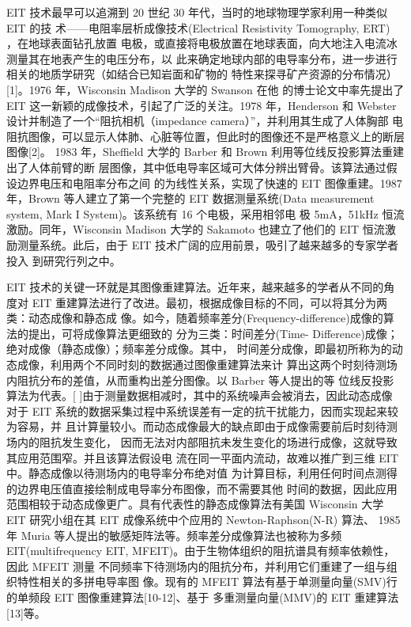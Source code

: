 
EIT 技术最早可以追溯到 20 世纪 30 年代，当时的地球物理学家利用一种类似 EIT 的技
术——电阻率层析成像技术(Electrical Resistivity Tomography, ERT) ，在地球表面钻孔放置
电极，或直接将电极放置在地球表面，向大地注入电流冰测量其在地表产生的电压分布，以
此来确定地球内部的电导率分布，进一步进行相关的地质学研究（如结合已知岩面和矿物的
特性来探寻矿产资源的分布情况）[1]。1976 年，Wisconsin Madison 大学的 Swanson 在他
的博士论文中率先提出了 EIT 这一新颖的成像技术，引起了广泛的关注。1978 年，Henderson
和 Webster 设计并制造了一个“阻抗相机（impedance camera）”，并利用其生成了人体胸部
电阻抗图像，可以显示人体肺、心脏等位置，但此时的图像还不是严格意义上的断层图像[2]。
1983 年，Sheffield 大学的 Barber 和 Brown 利用等位线反投影算法重建出了人体前臂的断
层图像，其中低电导率区域可大体分辨出臂骨。该算法通过假设边界电压和电阻率分布之间
的为线性关系，实现了快速的 EIT 图像重建。1987 年，Brown 等人建立了第一个完整的 EIT
数据测量系统(Data measurement system, Mark I System)。该系统有 16 个电极，采用相邻电
极 5mA，51kHz 恒流激励。同年，Wisconsin Madison 大学的 Sakamoto 也建立了他们的 EIT
恒流激励测量系统。此后，由于 EIT 技术广阔的应用前景，吸引了越来越多的专家学者投入
到研究行列之中。

EIT 技术的关键一环就是其图像重建算法。近年来，越来越多的学者从不同的角度对 EIT
重建算法进行了改进。最初，根据成像目标的不同，可以将其分为两类：动态成像和静态成
像。如今，随着频率差分(Frequency-difference)成像的算法的提出，可将成像算法更细致的
分为三类：时间差分(Time- Difference)成像；绝对成像（静态成像）；频率差分成像。其中，
时间差分成像，即最初所称为的动态成像，利用两个不同时刻的数据通过图像重建算法来计
算出这两个时刻待测场内阻抗分布的差值，从而重构出差分图像。以 Barber 等人提出的等
位线反投影算法为代表。[ ]由于测量数据相减时，其中的系统噪声会被消去，因此动态成像
对于 EIT 系统的数据采集过程中系统误差有一定的抗干扰能力，因而实现起来较为容易，并
且计算量较小。而动态成像最大的缺点即由于成像需要前后时刻待测场内的阻抗发生变化，
因而无法对内部阻抗未发生变化的场进行成像，这就导致其应用范围窄。并且该算法假设电
流在同一平面内流动，故难以推广到三维 EIT 中。静态成像以待测场内的电导率分布绝对值
为计算目标，利用任何时间点测得的边界电压值直接绘制成电导率分布图像，而不需要其他
时间的数据，因此应用范围相较于动态成像更广。具有代表性的静态成像算法有美国
Wisconsin 大学 EIT 研究小组在其 EIT 成像系统中个应用的 Newton-Raphson(N-R) 算法、
1985 年 Muria 等人提出的敏感矩阵法等。频率差分成像算法也被称为多频
EIT(multifrequency EIT, MFEIT)。由于生物体组织的阻抗谱具有频率依赖性，因此 MFEIT 测量
不同频率下待测场内的阻抗分布，并利用它们重建了一组与组织特性相关的多拼电导率图
像。现有的 MFEIT 算法有基于单测量向量(SMV)行的单频段 EIT 图像重建算法[10-12]、基于
多重测量向量(MMV)的 EIT 重建算法[13]等。

